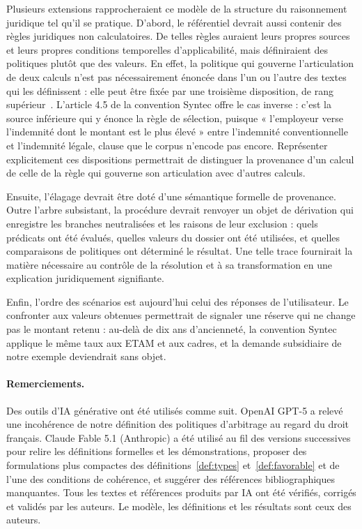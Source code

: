 \documentclass[review]{jflart}
\begin{document}
Plusieurs extensions rapprocheraient ce modèle de la structure du raisonnement
juridique tel qu'il se pratique. D'abord, le référentiel devrait aussi contenir
des règles juridiques non calculatoires. De telles règles auraient leurs
propres sources et leurs propres conditions temporelles d'applicabilité, mais
définiraient des politiques plutôt que des valeurs. En effet, la politique qui
gouverne l'articulation de deux calculs n'est pas nécessairement énoncée dans
l'un ou l'autre des textes qui les définissent : elle peut être fixée par une
troisième disposition, de rang supérieur~\cite{moizard2025fragmentation}.
L'article 4.5 de la convention Syntec offre le cas inverse : c'est la source
inférieure qui y énonce la règle de sélection, puisque « l'employeur verse
l'indemnité dont le montant est le plus élevé » entre l'indemnité
conventionnelle et l'indemnité légale, clause que le corpus n'encode pas
encore.
Représenter explicitement ces dispositions permettrait de distinguer la
provenance d'un calcul de celle de la règle qui gouverne son articulation avec
d'autres calculs.

Ensuite, l'élagage devrait être doté d'une sémantique formelle de provenance.
Outre l'arbre subsistant, la procédure devrait renvoyer un objet de
dérivation qui enregistre les branches neutralisées et les raisons de leur
exclusion : quels prédicats ont été évalués, quelles valeurs du dossier ont été
utilisées, et quelles comparaisons de politiques ont déterminé le résultat. Une
telle trace fournirait la matière nécessaire au contrôle de la résolution et à
sa transformation en une explication juridiquement signifiante.

Enfin, l'ordre des scénarios est aujourd'hui celui des réponses de
l'utilisateur. Le confronter aux valeurs obtenues permettrait de signaler une
réserve qui ne change pas le montant retenu : au-delà de dix ans d'ancienneté,
la convention Syntec applique le même taux aux ETAM et aux cadres, et la
demande subsidiaire de notre exemple deviendrait sans objet.

\paragraph{Remerciements.}
Des outils d'IA générative ont été utilisés comme suit. OpenAI GPT-5 a
relevé une incohérence de notre définition des politiques d'arbitrage au regard
du droit français. Claude Fable 5.1 (Anthropic) a été utilisé au fil des
versions successives pour relire les définitions formelles et les
démonstrations, proposer des formulations plus compactes des
définitions~\ref{def:types} et~\ref{def:favorable} et de l'une des conditions
de cohérence, et suggérer des références bibliographiques manquantes. Tous les
textes et références produits par IA ont été vérifiés, corrigés et validés par
les auteurs. Le modèle, les définitions et les résultats sont ceux des auteurs.



\end{document}
